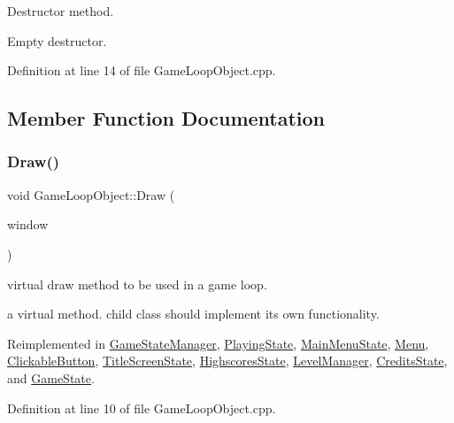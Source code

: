 Destructor method. 

Empty destructor. 

Definition at line 14 of file Game\+Loop\+Object.\+cpp.



\subsection{Member Function Documentation}
\mbox{\label{class_game_loop_object_a0572a88e5b98fa8a41078260d152202d}} 
\subsubsection{\texorpdfstring{Draw()}{Draw()}}
{\footnotesize\ttfamily void Game\+Loop\+Object\+::\+Draw (\begin{DoxyParamCaption}\item[{sf\+::\+Render\+Window \&}]{window }\end{DoxyParamCaption})\hspace{0.3cm}{\ttfamily [virtual]}}



virtual draw method to be used in a game loop. 

a virtual method. child class should implement its own functionality. 

Reimplemented in \hyperlink{class_game_state_manager_a4d42ae9f3b8c87f420fc79fd716e0c17}{Game\+State\+Manager}, \hyperlink{class_playing_state_a6f5feffc1c6de994450828fbe2f5c173}{Playing\+State}, \hyperlink{class_main_menu_state_a6965e10d73953ef09c63a64685136307}{Main\+Menu\+State}, \hyperlink{class_menu_a9052b7f20dcf6d9ed47d87f16fcfe5e9}{Menu}, \hyperlink{class_clickable_button_a55b5a7b941f25066a8d0481326794b62}{Clickable\+Button}, \hyperlink{class_title_screen_state_a1e1022947dac4a9b69c6bde57fe52217}{Title\+Screen\+State}, \hyperlink{class_highscores_state_a50fc2005675f2cc1740e3f9ef698bdab}{Highscores\+State}, \hyperlink{class_level_manager_a35cafa518fbbb9fdedfc6a587772bed9}{Level\+Manager}, \hyperlink{class_credits_state_a085e7decf7f1fc7edae68db50851b84a}{Credits\+State}, and \hyperlink{class_game_state_a8741c5c696c6c366beb4b845c08c3cf8}{Game\+State}.



Definition at line 10 of file Game\+Loop\+Object.\+cpp.

